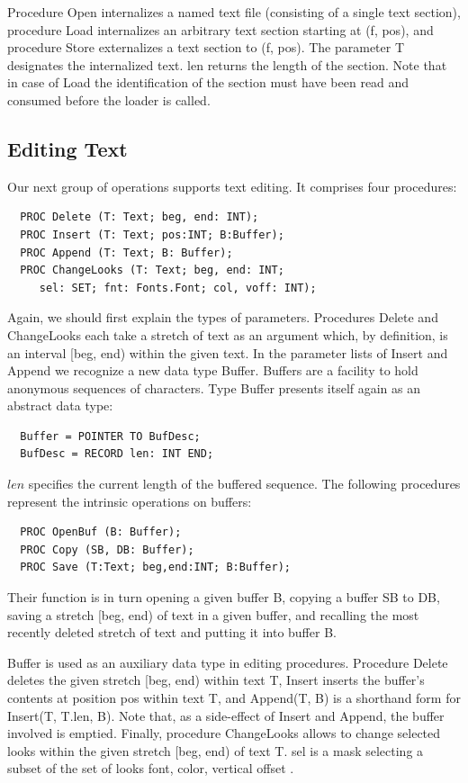 Procedure Open internalizes a named text file (consisting of a single text section), procedure Load
internalizes an arbitrary text section starting at (f, pos), and procedure Store externalizes a text
section to (f, pos). The parameter T designates the internalized text. len returns the length of the
section. Note that in case of Load the identification of the section must have been read and
consumed before the loader is called.

\subsection{Editing Text}
Our next group of operations supports text editing. It comprises four procedures:
\begin{verbatim}
  PROC Delete (T: Text; beg, end: INT);
  PROC Insert (T: Text; pos:INT; B:Buffer);
  PROC Append (T: Text; B: Buffer);
  PROC ChangeLooks (T: Text; beg, end: INT;
     sel: SET; fnt: Fonts.Font; col, voff: INT);
\end{verbatim}
Again, we should first explain the types of parameters. Procedures Delete and ChangeLooks each
take a stretch of text as an argument which, by definition, is an interval [beg, end) within the given
text. In the parameter lists of Insert and Append we recognize a new data type Buffer.
Buffers are a facility to hold anonymous sequences of characters. Type Buffer presents itself again
as an abstract data type:
\begin{verbatim}
  Buffer = POINTER TO BufDesc;
  BufDesc = RECORD len: INT END;
\end{verbatim}
$len$ specifies the current length of the buffered sequence. The following procedures represent the intrinsic operations on buffers:
\begin{verbatim}
  PROC OpenBuf (B: Buffer);
  PROC Copy (SB, DB: Buffer);
  PROC Save (T:Text; beg,end:INT; B:Buffer);
\end{verbatim}

Their function is in turn opening a given buffer B, copying a buffer SB to DB, saving a stretch [beg,
end) of text in a given buffer, and recalling the most recently deleted stretch of text and putting it
into buffer B.

Buffer is used as an auxiliary data type in editing procedures. Procedure Delete deletes the given
stretch [beg, end) within text T, Insert inserts the buffer's contents at position pos within text T, and
Append(T, B) is a shorthand form for Insert(T, T.len, B). Note that, as a side-effect of Insert and
Append, the buffer involved is emptied. Finally, procedure ChangeLooks allows to change selected
looks within the given stretch [beg, end) of text T. sel is a mask selecting a subset of the set of
looks { font, color, vertical offset }.

